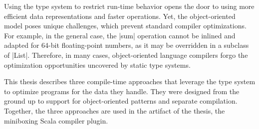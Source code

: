 Using the type system to restrict run-time behavior opens the door to using more efficient data representations and faster operations. Yet, the object-oriented model poses unique challenges, which prevent standard compiler optimizations. For example, in the general case, the |sum| operation cannot be inlined and adapted for 64-bit floating-point numbers, as it may be overridden in a subclass of |List|. Therefore, in many cases, object-oriented language compilers forgo the optimization opportunities uncovered by static type systems.

This thesis describes three compile-time approaches that leverage the type system to optimize programs for the data they handle. They were designed from the ground up to support for object-oriented patterns and separate compilation. Together, the three approaches are used in the artifact of the thesis, the miniboxing Scala compiler plugin.


%
%

